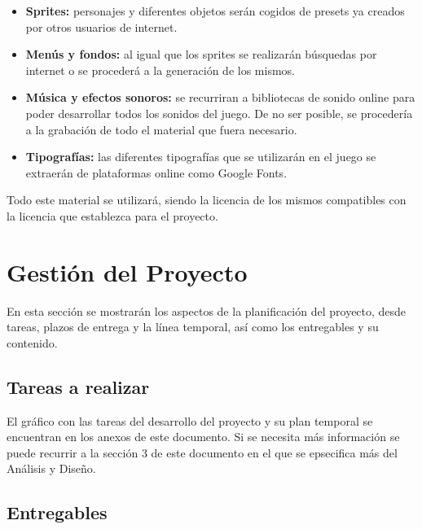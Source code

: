 \documentclass[a4paper]{article}
\begin{document}
\begin{itemize}
	\item \textbf{Sprites:} personajes y diferentes objetos serán cogidos de presets ya creados por otros usuarios de internet.
	\item \textbf{Menús y fondos:} al igual que los sprites se realizarán búsquedas por internet o se procederá a la generación de los mismos.
	\item \textbf{Música y efectos sonoros:} se recurriran a bibliotecas de sonido online para poder desarrollar todos los sonidos del juego. De no ser posible, se procedería a la grabación de todo el material que fuera necesario.
	\item \textbf{Tipografías:} las diferentes tipografías que se utilizarán en el juego se extraerán de plataformas online como Google Fonts.
\end{itemize}

Todo este material se utilizará, siendo la licencia de los mismos compatibles con la licencia que establezca para el proyecto.





















\section{Gestión del Proyecto}
En esta sección se mostrarán los aspectos de la planificación del proyecto, desde tareas, plazos de entrega y la línea temporal, así como los entregables y su contenido.

\subsection{Tareas a realizar}
El gráfico con las tareas del desarrollo del proyecto y su plan temporal se encuentran en los anexos de este documento. Si se necesita más información se puede recurrir a la sección 3 de este documento en el que se epsecifica más del Análisis y Diseño.

\subsection{Entregables}
\end{document}
